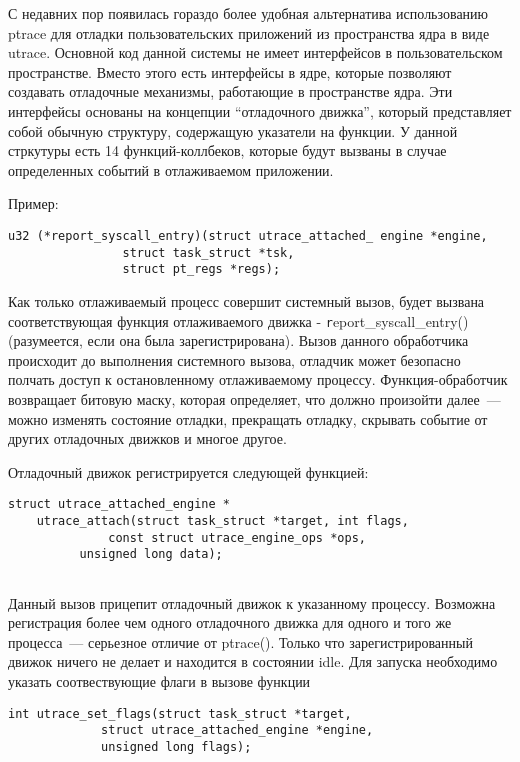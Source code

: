 С недавних пор появилась гораздо более удобная альтернатива использованию ptrace для отладки пользовательских приложений из пространства ядра в виде utrace. Основной код данной системы не имеет интерфейсов в пользовательском пространстве. Вместо этого есть интерфейсы в ядре, которые позволяют создавать отладочные механизмы, работающие в пространстве ядра. Эти интерфейсы основаны на концепции ``отладочного движка'', который представляет собой обычную структуру, содержащую указатели на функции. У данной стркутуры есть 14 функций-коллбеков, которые будут вызваны в случае определенных событий в отлаживаемом приложении. 

\bigskip 
Пример:

\bigskip
\begin{lstlisting}
u32 (*report_syscall_entry)(struct utrace_attached_ engine *engine,
				struct task_struct *tsk,
				struct pt_regs *regs);

\end{lstlisting}

\bigskip
Как только отлаживаемый процесс совершит системный вызов, будет вызвана соответствующая функция отлаживаемого движка - {\texttt report\_syscall\_entry()} (разумеется, если она была зарегистрирована). Вызов данного обработчика происходит до выполнения системного вызова, отладчик может безопасно полчать доступ к остановленному отлаживаемому процессу. Функция-обработчик возвращает битовую маску, которая определяет, что должно произойти далее~--- можно изменять состояние отладки, прекращать отладку, скрывать событие от других отладочных движков и многое другое. 

Отладочный движок регистрируется следующей функцией: 
\bigskip
\begin{lstlisting}
struct utrace_attached_engine *
    utrace_attach(struct task_struct *target, int flags,
	      	  const struct utrace_engine_ops *ops, 
		  unsigned long data);
  
\end{lstlisting}

\bigskip 
Данный вызов прицепит отладочный движок к указанному процессу. Возможна регистрация более чем одного отладочного движка для одного и того же процесса~--- серьезное отличие от ptrace(). Только что зарегистрированный движок ничего не делает и находится в состоянии idle. Для запуска необходимо указать соотвествующие флаги в вызове функции 

\bigskip
\begin{lstlisting}
int utrace_set_flags(struct task_struct *target,
			 struct utrace_attached_engine *engine,
			 unsigned long flags);

\end{lstlisting}

